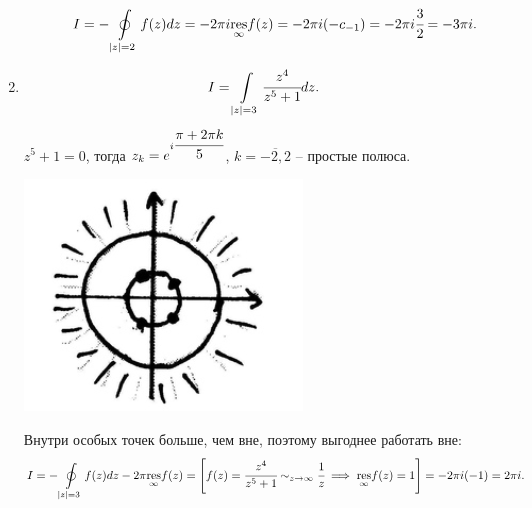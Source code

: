 \documentclass[../../main.tex]{subfiles}
\begin{document}
\begin{examples}
\begin{enumerate}
\begin{enumerate}
	 			
	 			\[I=-\oint\limits_{|z|=2}f(z)dz= -2\pi i \underset{\infty}{\operatorname{res}} f(z) = 
	 			-2\pi i (-c_{-1}) = -2 \pi i \cfrac{3}{2} = -3\pi i.\]
	 			
 			\end{enumerate}
 		\item \[I=\int\limits_{|z|=3} \cfrac{z^4}{z^5+1}dz.\]
 			$z^5+1=0$, тогда $z_k=e^{i\cfrac{\pi+2\pi k}{5}}$, $k=\overline{-2,2}$ -- 
 			простые полюса.
 			
 			\includegraphics{lec35_5}
 			
 			Внутри особых точек больше, чем вне, поэтому выгоднее работать вне:
 			\[
 			I=-\oint\limits_{|z|=3}f(z)dz-2\pi \underset{\infty}{\operatorname{res}}f(z)=\left[ 
 			f(z)=\cfrac{z^4}{z^5+1}\sim_{z \rightarrow \infty} \cfrac 1z \implies 
 			\underset{\infty}{\operatorname{res}} f(z)=1 \right]=-2\pi i(-1) = 2\pi i.
 			\]	
	 	\end{enumerate}
	 \end{examples}	
\end{document}
